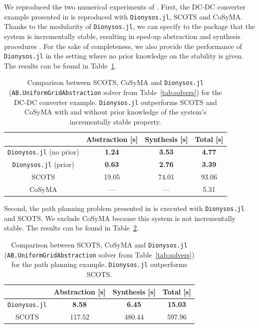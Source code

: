 \documentclass{juliacon}
\begin{document}
\vskip 6pt

We reproduced the two numerical experiments of \cite{rungger2016scots}. First, the DC-DC converter example presented in \cite[Section 4.2]{rungger2016scots} is reproduced with \texttt{Dionysos.jl}, SCOTS and CoSyMA. Thanks to the modularity of \texttt{Dionysos.jl}, we can specify to the package that the system is incrementally stable, resulting in sped-up abstraction and synthesis procedures \cite{Camara2011}. For the sake of completeness, we also provide the performance of \texttt{Dionysos.jl} in the setting where no prior knowledge on the stability is given. The results can be found in Table~\ref{tab:dcdc_bench}.

\begin{table}[ht!]
    \centering
    \begin{tabular}{c|ccc}
        & Abstraction [s] & Synthesis [s] & Total [s] \\ 
        \hline 
        \texttt{Dionysos.jl} (no prior) & \textbf{1.24} & \textbf{3.53} & \textbf{4.77} \\
        \texttt{Dionysos.jl} (prior) & \textbf{0.63} & \textbf{2.76} & \textbf{3.39} \\
        SCOTS & 19.05 & 74.01 & 93.06 \\
        CoSyMA & --- & --- & 5.31
    \end{tabular}
    \caption{Comparison between SCOTS, CoSyMA and \texttt{Dionysos.jl} (\texttt{AB.UniformGridAbstraction} solver from Table~\ref{tab:solvers}) for the DC-DC converter example. \texttt{Dionysos.jl} outperforms SCOTS and CoSyMA with and without prior knowledge of the system's incrementally stable property.}
    \label{tab:dcdc_bench}
\end{table}

Second, the path planning problem presented in \cite[Section 4.1]{rungger2016scots} is executed with \texttt{Dionysos.jl} and SCOTS. We exclude CoSyMA because this system is not incrementally stable. The results can be found in Table~\ref{tab:vehicle_bench}.

\begin{table}[ht!]
    \centering
    \begin{tabular}{c|ccc}
        & Abstraction [s] & Synthesis [s] & Total [s] \\ 
        \hline 
        \texttt{Dionysos.jl} & \textbf{8.58} & \textbf{6.45} & \textbf{15.03} \\
        SCOTS & 117.52 & 480.44 & 597.96 \\
    \end{tabular}
    \caption{Comparison between SCOTS, CoSyMA and \texttt{Dionysos.jl} (\texttt{AB.UniformGridAbstraction} solver from Table~\ref{tab:solvers}) for the path planning example. \texttt{Dionysos.jl} outperforms SCOTS.}
    \label{tab:vehicle_bench}
\end{table}
\end{document}
